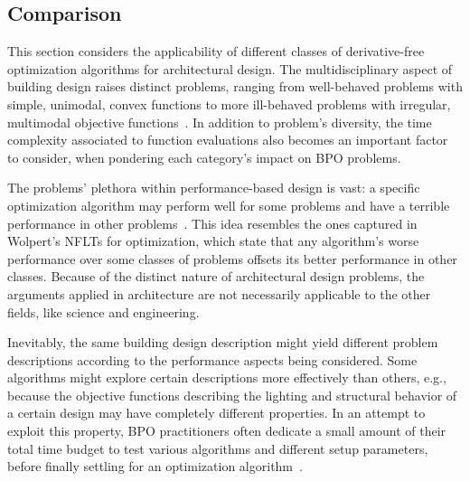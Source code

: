 \subsection{Comparison}
\label{ssec:comparison}

This section considers the applicability of different classes of derivative-free optimization algorithms for architectural design. The multidisciplinary aspect of building design raises distinct problems, ranging from well-behaved problems with simple, unimodal, convex functions to more ill-behaved problems with irregular, multimodal objective functions~\cite{Wortmann2017ADO}. In addition to problem's diversity, the time complexity associated to function evaluations also becomes an important factor to consider, when pondering each category's impact on \ac{BPO} problems.

The problems' plethora within performance-based design is vast: a specific optimization algorithm may perform well for some problems and have a terrible performance in other problems~\cite{Wortmann2017GABESTCHOICE, Fang2017}. This idea resembles the ones captured in Wolpert's \acp{NFLT} for optimization, which state that any algorithm's worse performance over some classes of problems offsets its better performance in other classes. Because of the distinct nature of architectural design problems, the arguments applied in architecture are not necessarily applicable to the other fields, like science and engineering. 
	
Inevitably, the same building design description might yield different problem descriptions according to the performance aspects being considered. Some algorithms might explore certain descriptions more effectively than others, e.g., because the objective functions describing the lighting and structural behavior of a certain design may have completely different properties. In an attempt to exploit this property, \ac{BPO} practitioners often dedicate a small amount of their total time budget to test various algorithms and different setup parameters, before finally settling for an optimization algorithm~\cite{Hamdy2016}.	
	
